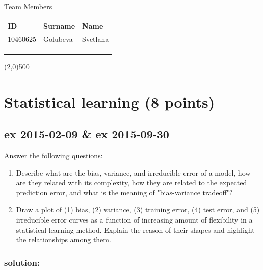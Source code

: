 \documentclass[a4paper,12pt,titlepage]{article} %
\begin{document}
\begin{titlepage}
		\vspace{20pt}
		
		\begin{center}
			{\large Team Members}
		\end{center}
		\begin{tabularx}{\textwidth}{|X|X|X|}
			\hline
			ID & Surname & Name\\
			\hline
			10460625 & Golubeva & Svetlana\\
			\hline
			&  & \\
			\hline
			&  & \\
			\hline
			&  & \\
			\hline
		\end{tabularx}
		
		\vspace{\fill}
		\begin{center}
			\line(2,0){500}
		\end{center}
		
	\end{titlepage}
\tableofcontents

\newpage
\section{Statistical learning (8 points)}
\subsection{ex 2015-02-09 \& ex 2015-09-30}
Answer the following questions:
\begin{enumerate}
\item Describe what are the bias, variance, and irreducible error of a model, how are they related with its complexity, how they are related to the expected prediction error, and what is the meaning of "bias-variance tradeoff"?
\item Draw a plot of (1) bias, (2) variance, (3) training error, (4) test error, and (5) irreducible error curves as a function of increasing amount of flexibility in a statistical learning method. Explain the reason of their shapes and highlight the relationships among them.
\end{enumerate}

\subsubsection{solution:}
\end{document}

